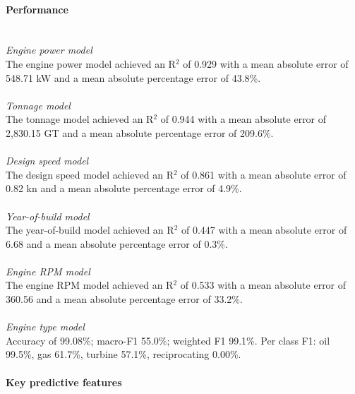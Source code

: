 \documentclass[lineno,pdflatex,sn-nature]{sn-jnl}
\begin{document}
\paragraph{Performance}
\\
\textit{Engine power model}
\\
The engine power model achieved an R$^2$ of 0.929 with a mean absolute error of 548.71 kW and a mean absolute percentage error of 43.8\%.
\\
\\
\textit{Tonnage model}
\\
The tonnage model achieved an R$^2$ of 0.944 with a mean absolute error of 2,830.15 GT and a mean absolute percentage error of 209.6\%.
\\
\\
\textit{Design speed model}
\\
The design speed model achieved an R$^2$ of 0.861 with a mean absolute error of 0.82 kn and a mean absolute percentage error of 4.9\%.
\\
\\
\textit{Year-of-build model}
\\
The year-of-build model achieved an R$^2$ of 0.447 with a mean absolute error of 6.68 and a mean absolute percentage error of 0.3\%.
\\
\\
\textit{Engine RPM model}
\\
The engine RPM model achieved an R$^2$ of 0.533 with a mean absolute error of 360.56 and a mean absolute percentage error of 33.2\%.
\\
\\
\textit{Engine type model}
\\
Accuracy of 99.08\%; macro-F1 55.0\%; weighted F1 99.1\%. Per class F1: oil 99.5\%, gas 61.7\%, turbine 57.1\%, reciprocating 0.00\%.

\paragraph{Key predictive features}
\end{document}
